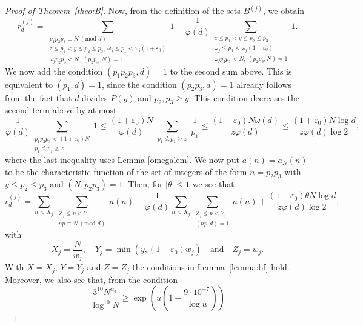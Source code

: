 \documentclass[12pt]{amsart}
\begin{document}
\begin{proof}[Proof of Theorem~\ref{theo:B}]
Now, from the definition of the sets $B^{(j)}$, we obtain
\begin{equation*}
r_d^{(j)}=\sum_{\substack{p_1p_2p_3\equiv N\: (\text{mod }d) \\ z\le p_1<y\le p_2\le p_3,~\omega_j\le p_1<\omega_j(1+\varepsilon_0) \\\omega_jp_2p_3<N,~(p_2p_3,N)=1 }} 1-\frac{1}{\varphi (d)} \sum_{\substack{z\le p_1<y\le p_2\le p_3\\\omega_j\le p_1<\omega_j(1+\varepsilon_0) \\\omega_jp_2p_3<N,~(p_2p_3,N)=1 }}1.
\end{equation*}
We now add the condition $(p_1p_2p_3,d)=1$ to the second sum above. This is equivalent to $(p_1,d)=1$, since the condition $(p_2p_3,d)=1$ already follows from the fact that $d$ divides $P(y)$ and $p_2,p_3\ge y$. This condition decreases the second term above by at most
\begin{equation*}
\frac{1}{\varphi(d)}\sum_{\substack{p_1p_2p_3<(1+\varepsilon_0)N\\p_1|d,p_1 \ge z}}1\le \frac{(1+\varepsilon_0)N}{\varphi(d)}\sum_{\substack{p_1|d,p_1 \ge z}}\frac{1}{p_1}\le \frac{(1+\varepsilon_0)N\omega(d)}{z\varphi(d)}\le \frac{(1+\varepsilon_0)N\log d}{z\varphi(d)\log 2},
\end{equation*}
where the last inequality uses Lemma \ref{omegalem}. We now put \label{def: a_N(n)} $a(n)=a_N(n)$ to be the characteristic function of the set of integers of the form $n=p_2p_3$ with $y\le p_2 \le p_3$ and $(N,p_2p_3)=1$. Then, for $\left|\theta\right|\le 1$ we see that
\begin{equation*}
r_d^{(j)}=\sum_{n<X_j}\sum_{\substack{Z_j \le p <Y_j\\np\equiv N\: (\text{mod }d)}} a(n)-\frac{1}{\varphi (d)}\sum_{n<X_j}\sum_{\substack{Z_j\le p<Y_j \\ (np,d)=1}} a(n)+\frac{(1+\varepsilon_0)\theta N\log d}{z\varphi(d)\log 2},
\end{equation*}
with
\begin{equation} \label{eq: def-final-X-Y-Z}
X_j=\frac{N}{w_j}, \quad
Y_j=\min\left(y,(1+\varepsilon_0)w_j\right) \quad\text{and}\quad
Z_j=w_j.
\end{equation}
With $X=X_j$, $Y=Y_j$ and $Z=Z_j$ the conditions in Lemma~\ref{lemma:bf} hold. Moreover, we also see that, from the condition
\begin{equation*}
    \frac{3^{10}N^{\alpha_3}}{\log^{10}N}\ge\exp\left(u\left(1+\frac{9\cdot 10^{-7}}{\log u}\right)\right) 
\end{equation*}

\end{proof}
\end{document}

